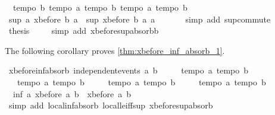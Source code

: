 \begin{isabellebody}
\ \ {\isachardoublequoteopen}tempo{}\ b{\isachardoublequoteclose}\ {\isachardoublequoteopen}tempo{}\ a{\isachardoublequoteclose}\ {\isachardoublequoteopen}tempo{}\ b{\isachardoublequoteclose}\ {\isachardoublequoteopen}tempo{}\ a{\isachardoublequoteclose}\ {\isachardoublequoteopen}tempo{}\ b{\isachardoublequoteclose}\isanewline
\ \ \isamarkupfalse%
\ {\isachardoublequoteopen}sup\ a\ {\isacharparenleft}xbefore\ b\ a{\isacharparenright}\ {\isacharequal}\ sup\ {\isacharparenleft}xbefore\ b\ a{\isacharparenright}\ a{\isachardoublequoteclose}\ \isanewline
\ \ \ \ \isamarkupfalse%
\ {\isacharparenleft}simp\ add{\isacharcolon}\ sup{\isachardot}commute{\isacharparenright}\isanewline
\ \ \isamarkupfalse%
\ {\isacharquery}thesis\ \isamarkupfalse%
\ {}\ \isamarkupfalse%
\ {\isacharparenleft}simp\ add{\isacharcolon}\ xbefore{\isacharunderscore}sup{\isacharunderscore}absorb{\isacharunderscore}{}b{\isacharparenright}\isanewline
{}\isamarkupfalse%
%
\endisatagproof
{\isafoldproof}%
%
\isadelimproof
%
\endisadelimproof
%
\begin{isamarkuptext}%
The following corollary proves \cref{thm:xbefore_inf_absorb_1}.%
\end{isamarkuptext}\isamarkuptrue%
\isamarkupfalse%
\ xbefore{\isacharunderscore}inf{\isacharunderscore}absorb{\isacharunderscore}{}{\isacharcolon}\ {\isachardoublequoteopen}independent{\isacharunderscore}events\ a\ b\ {\isasymLongrightarrow}\ \isanewline
\ \ {\isasymlbrakk}\ tempo{}\ a{\isacharsemicolon}\ tempo{}\ b\ {\isasymrbrakk}\ {\isasymLongrightarrow}\isanewline
\ \ {\isasymlbrakk}\ tempo{}\ a{\isacharsemicolon}\ tempo{}\ b\ {\isasymrbrakk}\ {\isasymLongrightarrow}\isanewline
\ \ {\isasymlbrakk}\ tempo{}\ a{\isacharsemicolon}\ tempo{}\ b\ {\isasymrbrakk}\ {\isasymLongrightarrow}\isanewline
\ \ {\isasymlbrakk}\ tempo{}\ a{\isacharsemicolon}\ tempo{}\ b\ {\isasymrbrakk}\ {\isasymLongrightarrow}\isanewline
\ \ inf\ a\ {\isacharparenleft}xbefore\ a\ b{\isacharparenright}\ {\isacharequal}\ xbefore\ a\ b{\isachardoublequoteclose}\isanewline
%
\isadelimproof
%
\endisadelimproof
%
\isatagproof
{}\isamarkupfalse%
\ {\isacharparenleft}simp\ add{\isacharcolon}\ local{\isachardot}inf{\isacharunderscore}absorb{}\ local{\isachardot}le{\isacharunderscore}iff{\isacharunderscore}sup\ xbefore{\isacharunderscore}sup{\isacharunderscore}absorb{\isacharunderscore}{}{\isacharparenright}%

\end{isabellebody}
